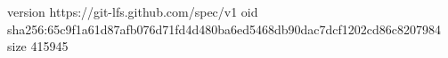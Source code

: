 version https://git-lfs.github.com/spec/v1
oid sha256:65c9f1a61d87afb076d71fd4d480ba6ed5468db90dac7dcf1202cd86c8207984
size 415945

